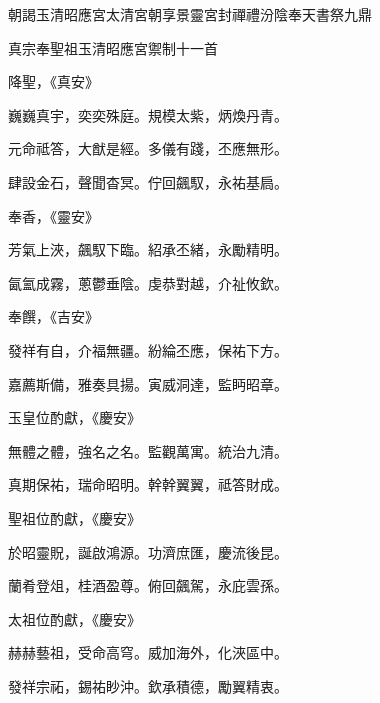 
\begin{pinyinscope}

 朝謁玉清昭應宮太清宮朝享景靈宮封禪禮汾陰奉天書祭九鼎



 真宗奉聖祖玉清昭應宮禦制十一首



 降聖，《真安》



 巍巍真宇，奕奕殊庭。規模太紫，炳煥丹青。



 元命祗答，大猷是經。多儀有踐，丕應無形。



 肆設金石，聲聞杳冥。佇回飆馭，永祐基扃。



 奉香，《靈安》



 芳氣上浹，飆馭下臨。紹承丕緒，永勵精明。



 氤氳成霧，蔥鬱垂陰。虔恭對越，介祉攸欽。



 奉饌，《吉安》



 發祥有自，介福無疆。紛綸丕應，保祐下方。



 嘉薦斯備，雅奏具揚。寅威洞達，監眄昭章。



 玉皇位酌獻，《慶安》



 無體之體，強名之名。監觀萬寓。統治九清。



 真期保祐，瑞命昭明。幹幹翼翼，祗答財成。



 聖祖位酌獻，《慶安》



 於昭靈貺，誕啟鴻源。功濟庶匯，慶流後昆。



 蘭肴登俎，桂酒盈尊。俯回飆駕，永庇雲孫。



 太祖位酌獻，《慶安》



 赫赫藝祖，受命高穹。威加海外，化浹區中。



 發祥宗祏，錫祐眇沖。欽承積德，勵翼精衷。




\end{pinyinscope}
